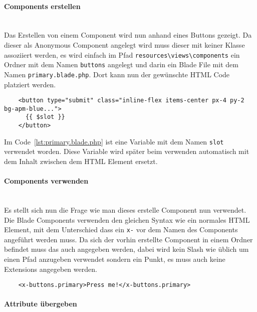\paragraph{Components erstellen}\mbox{}\\

Das Erstellen von einem Component wird nun anhand eines Buttons gezeigt. Da
dieser als Anonymous Component angelegt wird muss dieser mit keiner Klasse
assoziiert werden, es wird einfach im Pfad
\verb|resources\views\components| ein Ordner mit dem Namen \verb|buttons|
angelegt und darin ein Blade File mit dem Namen \verb|primary.blade.php|. Dort
kann nun der gewünschte HTML Code platziert werden.

\begin{listing}[H]
  \begin{verbatim}
    <button type="submit" class="inline-flex items-center px-4 py-2 bg-apm-blue...">
      {{ $slot }}
    </button>
  \end{verbatim}
  \caption{primary.blade.php}
  \label{lst:primary.blade.php}
\end{listing}


Im Code~\ref{lst:primary.blade.php} ist eine Variable mit dem Namen \verb|slot|
verwendet worden. Diese Variable wird später beim verwenden automatisch mit dem
Inhalt zwischen dem HTML Element ersetzt.


\paragraph{Components verwenden}\mbox{}\\

Es stellt sich nun die Frage wie man dieses erstelle Component nun verwendet.
Die Blade Components verwenden den gleichen Syntax wie ein normales HTML
Element, mit dem Unterschied dass ein \verb|x-| vor dem Namen des Components
angeführt werden muss. Da sich der vorhin erstellte Component in einem Ordner befindet muss das auch
angegeben werden, dabei wird kein Slash wie üblich um einen Pfad anzugeben
verwendet sondern ein Punkt, es muss auch keine Extensions angegeben werden.

\begin{listing}[H]
  \begin{verbatim}
    <x-buttons.primary>Press me!</x-buttons.primary>
  \end{verbatim}
  \caption{Verwendung eines Button Components}
\end{listing}


\paragraph{Attribute übergeben}\mbox{}\\

